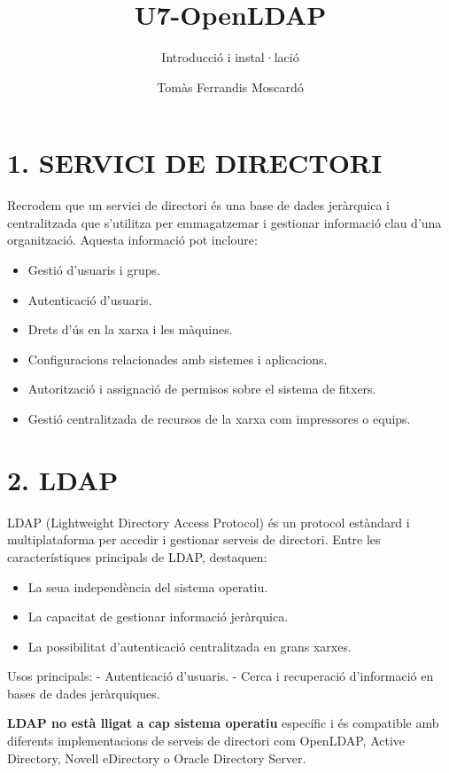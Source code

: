\documentclass[
  12 pt,
  a4paper,
]{article}
\title{U7-OpenLDAP}
\subtitle{Introducció i instal·lació}
\author{Tomàs Ferrandis Moscardó}
\date{}
\providecommand{\tightlist}{%
  \setlength{\itemsep}{0pt}\setlength{\parskip}{0pt}}
\begin{document}
\maketitle

{
\setcounter{tocdepth}{2}
\tableofcontents
}
\section{1. SERVICI DE DIRECTORI}\label{servici-de-directori}

Recrodem que un servici de directori és una base de dades jeràrquica i
centralitzada que s'utilitza per emmagatzemar i gestionar informació
clau d'una organització. Aquesta informació pot incloure:

\begin{itemize}
\tightlist
\item
  Gestió d'usuaris i grups.
\item
  Autenticació d'usuaris.
\item
  Drets d'ús en la xarxa i les màquines.
\item
  Configuracions relacionades amb sistemes i aplicacions.
\item
  Autorització i assignació de permisos sobre el sistema de fitxers.
\item
  Gestió centralitzada de recursos de la xarxa com impressores o equips.
\end{itemize}

\section{2. LDAP}\label{ldap}

LDAP (Lightweight Directory Access Protocol) és un protocol estàndard i
multiplataforma per accedir i gestionar serveis de directori. Entre les
característiques principals de LDAP, destaquen:

\begin{itemize}
\tightlist
\item
  La seua independència del sistema operatiu.
\item
  La capacitat de gestionar informació jeràrquica.
\item
  La possibilitat d'autenticació centralitzada en grans xarxes.
\end{itemize}

Usos principals: - Autenticació d'usuaris. - Cerca i recuperació
d'informació en bases de dades jeràrquiques.

\textbf{LDAP no està lligat a cap sistema operatiu} específic i és
compatible amb diferents implementacions de serveis de directori com
OpenLDAP, Active Directory, Novell eDirectory o Oracle Directory Server.
\end{document}
